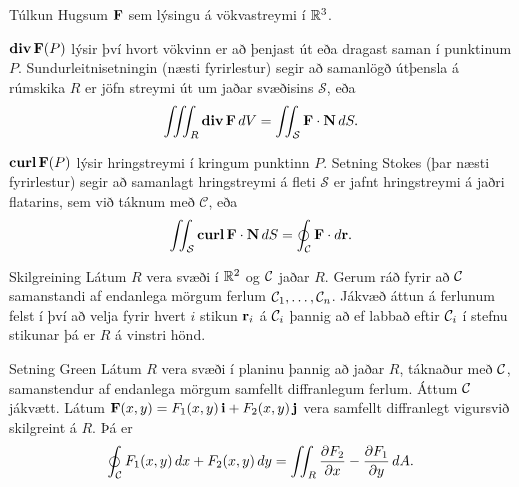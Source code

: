 \begin{frame}{} 

\begin {block}{Túlkun \rtask{}}
 Hugsum $\mbox{${\bf F}$}$ sem lýsingu á vökvastreymi í ${\mathbb R}^3$.

$\mbox{${\rm\bf div\,}$} \mbox{${\bf F}$}(P)$ lýsir því hvort vökvinn er að þenjast út eða dragast
saman í punktinum $P$.  Sundurleitnisetningin (næsti fyrirlestur)
segir að samanlögð útþensla á rúmskika $R$ er jöfn streymi út um jaðar svæðisins $\mathcal{S}$,
eða 
$$\thrint_R\dive\Fv\,dV=\tvint_{\mathcal{S}} \Fv\cdot\Nv\,dS.$$

$\mbox{${\rm\bf curl\,}$} \mbox{${\bf F}$}(P)$ lýsir hringstreymi í kringum punktinn $P$.  Setning
Stokes (þar næsti fyrirlestur) segir að samanlagt hringstreymi á fleti $\mathcal{S}$
er jafnt hringstreymi á jaðri flatarins, sem við táknum með $\mathcal{C}$, eða
$$\int\!\!\!\int_{\cal S} \mbox{${\rm\bf curl\,}$}\mbox{${\bf F}$}\cdot\mbox{${\bf N}$}\,dS=\oint_\mathcal{C} \mbox{${\bf F}$}\cdot d\mbox{${\bf r}$}.$$
\end{block}

\end{frame}



\begin{frame}{} 

\begin {block}{Skilgreining \rtask{}}
 Látum $R$ vera svæði í ${\mathbb R}^2$ og $\cal C$
jaðar $R$.  Gerum ráð fyrir að $\cal C$ samanstandi af endanlega
mörgum ferlum ${\cal C}_1, \ldots, {\cal C}_n$.  Jákvæð áttun á
ferlunum felst í því að velja fyrir hvert $i$ stikun $\mbox{${\bf r}$}_i$ á ${\cal
  C}_i$ þannig að ef labbað eftir ${\cal C}_i$ í stefnu stikunar þá er
$R$ á vinstri hönd.
\end{block}

\end{frame}



\begin{frame}{} 

\begin {block}{Setning Green \rtask{}}
  Látum $R$ vera svæði í planinu þannig að
jaðar $R$, táknaður með $\cal C$,  
samanstendur af endanlega mörgum samfellt diffranlegum
ferlum.  Áttum $\cal C$ jákvætt.  Látum
$\mbox{${\bf F}$}(x,y)=F_1(x,y)\,\mbox{${\bf i}$}+F_2(x,y)\,\mbox{${\bf j}$}$ vera samfellt diffranlegt
vigursvið skilgreint á $R$.  Þá er 
$$\oint_{\cal C}F_1(x,y)\,dx+F_2(x,y)\,dy=\int\!\!\!\int_R
\frac{\partial  F_2}{\partial x}- 
\frac{\partial  F_1}{\partial y}\,dA.$$
\end{block}

\end{frame}



